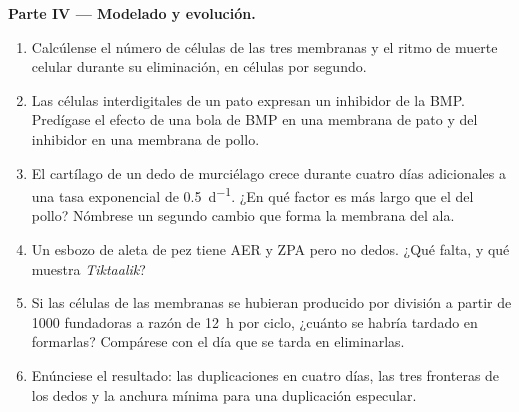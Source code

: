 \begin{problem}
\medskip
\noindent\textbf{Parte IV --- Modelado y evolución.}
\begin{enumerate}[resume]
  \item Calcúlense el número de células de las tres membranas y el ritmo
        de muerte celular durante su eliminación, en células por segundo.
  \item Las células interdigitales de un pato expresan un inhibidor de la
        BMP. Predígase el efecto de una bola de BMP en una membrana de pato
        y del inhibidor en una membrana de pollo.
  \item El cartílago de un dedo de murciélago crece durante cuatro días
        adicionales a una tasa exponencial de \qty{0.5}{d^{-1}}. ¿En qué
        factor es más largo que el del pollo? Nómbrese un segundo cambio
        que forma la membrana del ala.
  \item Un esbozo de aleta de pez tiene AER y ZPA pero no dedos. ¿Qué
        falta, y qué muestra \emph{Tiktaalik}?
  \item Si las células de las membranas se hubieran producido por
        división a partir de \num{1000} fundadoras a razón de \qty{12}{h}
        por ciclo, ¿cuánto se habría tardado en formarlas? Compárese con
        el día que se tarda en eliminarlas.
  \item Enúnciese el resultado: las duplicaciones en cuatro días, las tres
        fronteras de los dedos y la anchura mínima para una duplicación
        especular.
\end{enumerate}
\end{problem}
